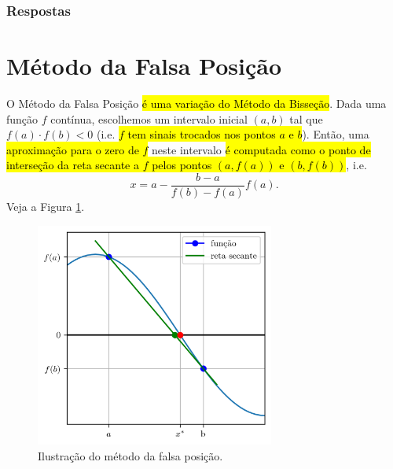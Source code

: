 \ifisbook
\subsubsection{Respostas}
\shipoutAnswer
\fi


\section{Método da Falsa Posição}\label{cap_eq1d_sec_falsapos}

O Método da Falsa Posição \hl{é uma variação do Método da Bisseção}. Dada uma função $f$ contínua, escolhemos um intervalo inicial $(a, b)$ tal que $f(a)\cdot f(b) < 0$ (i.e. \hl{$f$ tem sinais trocados nos pontos $a$ e $b$}). Então, uma \hl{aproximação para o zero de $f$} neste intervalo \hl{é computada como o ponto de interseção da reta secante a $f$ pelos pontos $(a, f(a))$ e $(b, f(b))$}, i.e.
\begin{equation}
  x = a - \frac{b-a}{f(b)-f(a)}f(a).
\end{equation}
Veja a Figura \ref{cap_eq1d_sec_falsapos:fig:falsapos}.

\begin{figure}[H]
  \centering
  \includegraphics[width=0.7\textwidth]{./cap_eq1d/dados/fig_falsapos/fig}
  \caption{Ilustração do método da falsa posição.}
  \label{cap_eq1d_sec_falsapos:fig:falsapos}
\end{figure}

